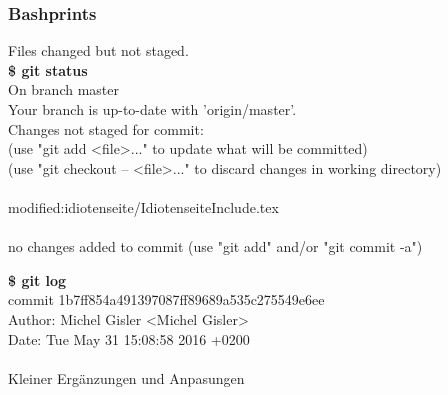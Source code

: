 \subsubsection{Bashprints}
\begin{multicols}{2}
	\begin{minipage}[l]{.40\textwidth}
		Files changed but not staged.\\    
		\textbf{\$ git status}\\
		On branch master\\
		Your branch is up-to-date with 'origin/master'.\\
		Changes not staged for commit:\\
		\quad (use "git add <file>..." to update what will be committed)\\
		\quad (use "git checkout -- <file>..." to discard changes in working directory)\\
		\\
		\qquad modified:\quad idiotenseite/IdiotenseiteInclude.tex\\
		\\
		no changes added to commit \newline (use "git add" and/or "git commit -a")\\
	\end{minipage}
	
	\begin{minipage}[r]{.40\textwidth}
		\textbf{\$ git log}\\
		commit 1b7ff854a491397087ff89689a535c275549e6ee\\
		Author: \quad Michel Gisler <Michel Gisler>\\
		Date:  \quad  Tue May 31 15:08:58 2016 +0200\\
		\\  
		\qquad Kleiner Ergänzungen und Anpasungen\\
	\end{minipage}
\end{multicols}
\clearpage
\pagebreak
